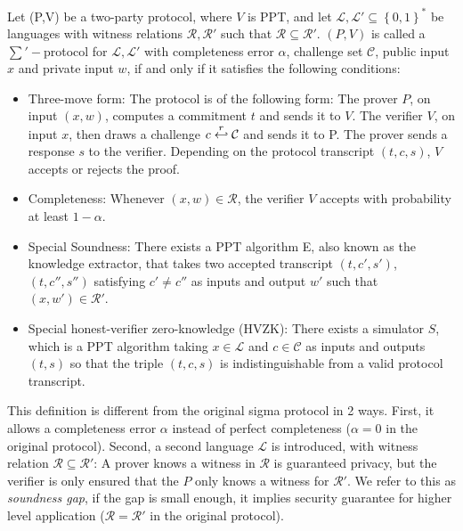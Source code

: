 \begin{definition}
  \label{def:zkp-sum-protocol}
  Let (P,V) be a two-party protocol, where $V$ is PPT, and let
  $\mathcal{L},\mathcal{L'} \subseteq \left\{ 0,1 \right\}^*$ be languages with
  witness relations $\mathcal{R},\mathcal{R'}$ such that $\mathcal{R}
  \subseteq \mathcal{R'}$. $(P,V)$ is called a $\sum'-$protocol for
  $\mathcal{L}, \mathcal{L'}$ with completeness error $\alpha$, challenge set
  $\mathcal{C}$, public input $x$ and private input $w$, if and only if it
  satisfies the following conditions:
  \begin{itemize}
  \item Three-move form: The protocol is of the following form: The
    prover $P$, on input $(x,w)$, computes a commitment $t$ and sends it
    to $V$. The verifier $V$, on input $x$, then draws a challenge
    $c \stackrel{r}{\hookleftarrow} \mathcal{C}$ and sends it to P. The prover sends a
    response $s$ to the verifier. Depending on the protocol transcript
    $(t,c,s)$, $V$ accepts or rejects the proof.
  \item Completeness: Whenever $(x,w) \in \mathcal{R}$, the verifier
    $V$ accepts with probability at least $1 - \alpha$.
  \item Special Soundness: There exists a PPT algorithm E, also known as
    the knowledge extractor, that takes two accepted transcript
    $(t,c',s')$,$(t,c'',s'')$ satisfying $c' \neq c''$ as inputs and
    output $w'$ such that $(x,w') \in \mathcal{R'}$.
  \item Special honest-verifier zero-knowledge (HVZK): There exists a
    simulator $S$, which is a PPT
    algorithm taking $x\in \mathcal{L}$ and $c \in \mathcal{C}$ as
    inputs and outputs $(t,s)$ so that the triple $(t,c,s)$ is
    indistinguishable from a valid protocol transcript.
  \end{itemize}
\end{definition}

This definition is different from the original sigma protocol in 2 ways.
First, it allows a completeness error $\alpha$ instead of perfect completeness
($\alpha=0$ in the original protocol).
Second, a second language $\mathcal{L}$ is introduced, with witness relation
$\mathcal{R} \subseteq \mathcal{R'}$: A prover knows a witness in $\mathcal{R}$
is guaranteed privacy, but the verifier is only ensured that the $P$ only knows
a witness for $\mathcal{R'}$. We refer to this as \emph{soundness gap}, if the
gap is small enough, it implies security guarantee for higher level application
($\mathcal{R} = \mathcal{R'}$ in the original protocol).

